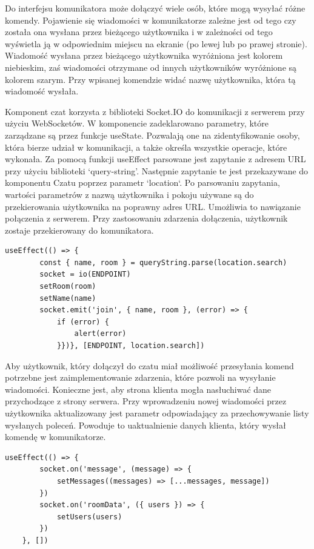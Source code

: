Do interfejsu komunikatora może dołączyć wiele osób, które mogą wysyłać różne komendy. Pojawienie się wiadomości w komunikatorze zależne jest od tego czy została ona wysłana przez bieżącego użytkownika i w zależności od tego wyświetla ją w odpowiednim miejscu na ekranie (po lewej lub po prawej stronie). Wiadomość wysłana przez bieżącego użytkownika wyróżniona jest kolorem niebieskim, zaś wiadomości otrzymane od innych użytkowników wyróżnione są kolorem szarym. Przy wpisanej komendzie widać nazwę użytkownika, która tą wiadomość wysłała.

Komponent czat korzysta z biblioteki Socket.IO do komunikacji z serwerem przy użyciu WebSocketów. W komponencie zadeklarowano parametry, które zarządzane są przez funkcje useState. Pozwalają one na zidentyfikowanie osoby, która bierze udział w komunikacji, a także określa wszystkie operacje, które wykonała. Za pomocą funkcji useEffect parsowane jest zapytanie z adresem URL przy użyciu biblioteki ‘query-string’. Następnie zapytanie te jest przekazywane do komponentu Czatu poprzez parametr `location`. Po parsowaniu zapytania, wartości parametrów z nazwą użytkownika i pokoju używane są do przekierowania użytkownika na poprawny adres URL. Umożliwia to nawiązanie połączenia z serwerem. Przy zastosowaniu zdarzenia dołączenia, użytkownik zostaje przekierowany do komunikatora.

\begin{lstlisting}[caption=Implementacja funkcji dolaczenia do komunikatora po stronie klienta]
useEffect(() => {
        const { name, room } = queryString.parse(location.search)
        socket = io(ENDPOINT)
        setRoom(room)
        setName(name)
        socket.emit('join', { name, room }, (error) => {
            if (error) {
                alert(error)
            }})}, [ENDPOINT, location.search])
\end{lstlisting}

Aby użytkownik, który dołączył do czatu miał możliwość przesyłania komend potrzebne jest zaimplementowanie zdarzenia, które pozwoli na wysyłanie wiadomości. Konieczne jest, aby strona klienta mogła nasłuchiwać dane przychodzące z strony serwera. Przy wprowadzeniu nowej wiadomości przez użytkownika aktualizowany jest parametr odpowiadający za przechowywanie listy wysłanych poleceń. Powoduje to uaktualnienie danych klienta, który wysłał komendę w komunikatorze.
\begin{lstlisting}[caption=Implementacja funkcji nasluchiwania wiadomosci i danych przychodzacych od serwera]
useEffect(() => {
        socket.on('message', (message) => {
            setMessages((messages) => [...messages, message])
        })
        socket.on('roomData', ({ users }) => {
            setUsers(users)
        })
    }, [])
\end{lstlisting}

